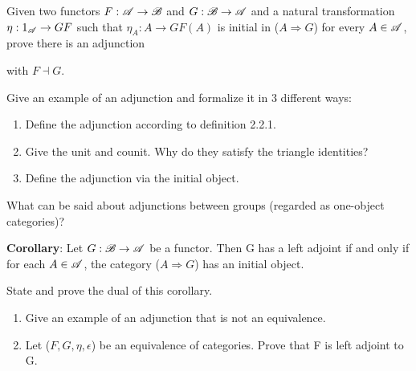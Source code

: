 \begin{exercise}
Given two functors $F: \operatorname{\mathscr A} \rightarrow \operatorname{\mathscr B}$ and $G: \operatorname{\mathscr B} \rightarrow \operatorname{\mathscr A}$ and a natural transformation $\eta: 1_{\operatorname{\mathscr A}} \rightarrow GF$ such that $\eta_A: A \rightarrow GF(A)$ is initial in ($A \Rightarrow G$) for every $A \in \operatorname{\mathscr A}$, prove there is an adjunction 
with $F \dashv G$.
\end{exercise}

\begin{exercise}
Give an example of an adjunction and formalize it in 3 different ways:
\begin{enumerate}
\item Define the adjunction according to definition 2.2.1.
\item Give the unit and counit. Why do they satisfy the triangle identities?
\item Define the adjunction via the initial object.
\end{enumerate}
\end{exercise}


\begin{exercise}
What can be said about adjunctions between groups (regarded as one-object categories)?
\end{exercise}

\textbf{Corollary}: Let $G: \operatorname{\mathscr B} \rightarrow \operatorname{\mathscr A}$ be a functor. Then G has a left adjoint if and only if for each $A \in \operatorname{\mathscr A}$, the category ($A \Rightarrow G$) has an initial object.\\

\begin{exercise}
State and prove the dual of this corollary.
\end{exercise}

\begin{exercise}
\begin{enumerate}
\item Give an example of an adjunction that is not an equivalence.
\item Let ($F, G, \eta, \epsilon$) be an equivalence of categories. Prove that F is left adjoint to G.
\end{enumerate}
\end{exercise}

